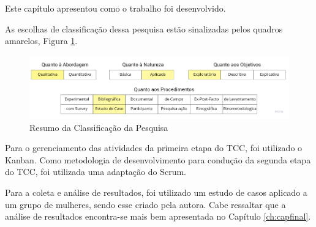 Este capítulo apresentou como o trabalho foi desenvolvido.

As escolhas de classificação dessa pesquisa estão sinalizadas pelos quadros amarelos, Figura \ref{fig06}.

\begin{figure}[ht]
	\caption{Resumo da Classificação da Pesquisa}
	\begin{center}
	\includegraphics[keepaspectratio=true,scale=0.28]{figuras/resumoAbordagem.pdf}
	\end{center}
    \label{fig06}
\end{figure}

Para o gerenciamento das atividades da primeira etapa do TCC, foi utilizado o Kanban. Como metodologia de desenvolvimento 
para condução da segunda etapa do TCC, foi utilizada uma adaptação do Scrum.

Para a coleta e análise de resultados, foi utilizado um estudo 
de casos aplicado a um grupo de mulheres, sendo esse criado pela 
autora. Cabe ressaltar que a análise de resultados encontra-se mais bem apresentada no Capítulo \ref{ch:capfinal}.



